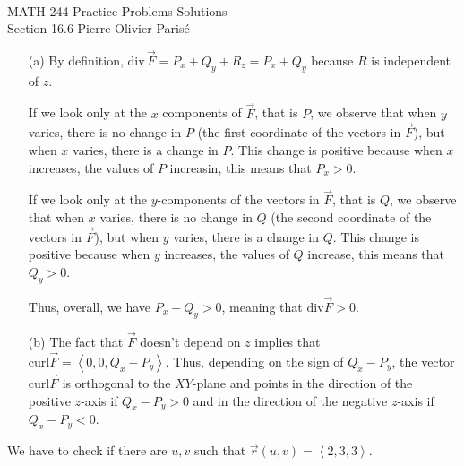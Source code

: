 


	\noindent \hrulefill \\
	MATH-244 \semester \hfill Practice Problems Solutions\\
	Section 16.6 \hfill Pierre-Olivier Paris{\'e} \\\vspace*{-1cm}
	
	\noindent\hrulefill
	
	\spc	
	
	\vspace*{-0.5cm}
	\begin{enumerate}
	\item[(a)] By definition, $\mathrm{div}\, \vec{F} = P_x + Q_y + R_z = P_x + Q_y$ because $R$ is independent of $z$.
	
	If we look only at the $x$ components of $\vec{F}$, that is $P$, we observe that when $y$ varies, there is no change in $P$ (the first coordinate of the vectors in $\vec{F}$), but when $x$ varies, there is a change in $P$. This change is positive because when $x$ increases, the values of $P$ increasin, this means that $P_x > 0$.
	
	If we look only at the $y$-components of the vectors in $\vec{F}$, that is $Q$, we observe that when $x$ varies, there is no change in $Q$ (the second coordinate of the vectors in $\vec{F}$), but when $y$ varies, there is a change in $Q$. This change is positive because when $y$ increases, the values of $Q$ increase, this means that $Q_y > 0$. 
	
	Thus, overall, we have $P_x + Q_y > 0$, meaning that $\mathrm{div} \vec{F} > 0$.
	
	\item[(b)] The fact that $\vec{F}$ doesn't depend on $z$ implies that $\mathrm{curl} \vec{F} = \left\langle 0 , 0 , Q_x - P_y \right\rangle$. Thus, depending on the sign of $Q_x - P_y$, the vector $\mathrm{curl} \vec{F}$ is orthogonal to the $XY$-plane and points in the direction of the positive $z$-axis if $Q_x - P_y > 0$ and in the direction of the negative $z$-axis if $Q_x - P_y < 0$.
	\end{enumerate}
	
	\spc
	
	We have to check if there are $u, v$ such that $\vec{r} (u, v) = \left\langle 2, 3, 3 \right\rangle$.
	
